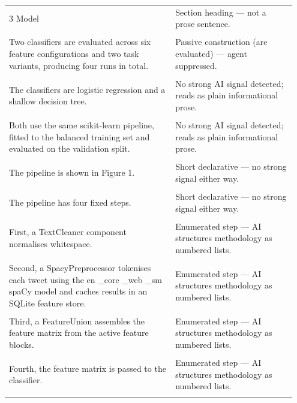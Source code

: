 \documentclass[11pt]{article}
\begin{document}
\begin{longtable}{|p{0.55\linewidth}|p{0.40\linewidth}|}
\hline
\rule{0pt}{3.5cm} & \\
\hline
3 Model & Section heading --- not a prose sentence. \\[2pt]
\hline
\rule{0pt}{3.5cm} & \\
\hline
Two classifiers are evaluated across six feature configurations and two task variants, producing four runs in total. & Passive construction (are evaluated) --- agent suppressed. \\[2pt]
\hline
\rule{0pt}{3.5cm} & \\
\hline
The classifiers are logistic regression and a shallow decision tree. & No strong AI signal detected; reads as plain informational prose. \\[2pt]
\hline
\rule{0pt}{3.5cm} & \\
\hline
Both use the same scikit-learn pipeline, fitted to the balanced training set and evaluated on the validation split. & No strong AI signal detected; reads as plain informational prose. \\[2pt]
\hline
\rule{0pt}{3.5cm} & \\
\hline
The pipeline is shown in Figure 1. & Short declarative --- no strong signal either way. \\[2pt]
\hline
\rule{0pt}{3.5cm} & \\
\hline
The pipeline has four fixed steps. & Short declarative --- no strong signal either way. \\[2pt]
\hline
\rule{0pt}{3.5cm} & \\
\hline
First, a TextCleaner component normalises whitespace. & Enumerated step --- AI structures methodology as numbered lists. \\[2pt]
\hline
\rule{0pt}{3.5cm} & \\
\hline
Second, a SpacyPreprocessor tokenises each tweet using the en \_core \_web \_sm spaCy model and caches results in an SQLite feature store. & Enumerated step --- AI structures methodology as numbered lists. \\[2pt]
\hline
\rule{0pt}{3.5cm} & \\
\hline
Third, a FeatureUnion assembles the feature matrix from the active feature blocks. & Enumerated step --- AI structures methodology as numbered lists. \\[2pt]
\hline
\rule{0pt}{3.5cm} & \\
\hline
Fourth, the feature matrix is passed to the classifier. & Enumerated step --- AI structures methodology as numbered lists. \\[2pt]
\hline
\rule{0pt}{3.5cm} & \\

\end{longtable}
\end{document}
